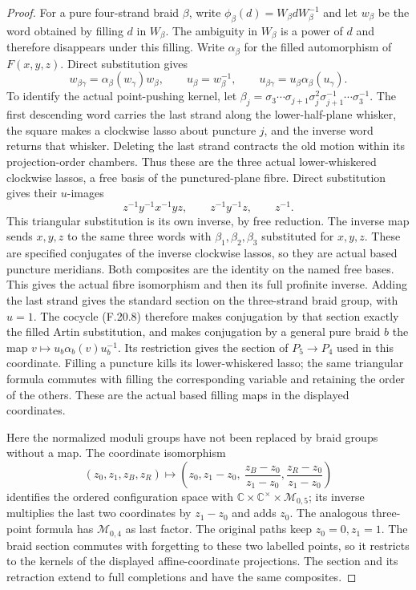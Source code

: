 \begin{proof}
For a pure four-strand braid $\beta$, write
$\phi_\beta(d)=W_\beta dW_\beta^{-1}$ and let $w_\beta$
be the word obtained by filling $d$ in $W_\beta$.
The ambiguity in $W_\beta$ is a power of $d$ and
therefore disappears under this filling.
Write $\alpha_\beta$ for the filled automorphism of
$F(x,y,z)$. Direct substitution gives
\[
 w_{\beta\gamma}=\alpha_\beta(w_\gamma)w_\beta,\qquad
 u_\beta=w_\beta^{-1},\qquad
 u_{\beta\gamma}=u_\beta\alpha_\beta(u_\gamma).
                                                               \tag{F.20.8}
\]
To identify the actual point-pushing kernel, let
$\beta_j=\sigma_3\cdots\sigma_{j+1}\sigma_j^2
 \sigma_{j+1}^{-1}\cdots\sigma_3^{-1}$.
The first descending word carries the last strand along
the lower-half-plane whisker, the square makes a clockwise
lasso about puncture $j$, and the inverse word returns
that whisker. Deleting the last strand contracts the
old motion within its projection-order chambers. Thus
these are the three actual lower-whiskered clockwise
lassos, a free basis of the punctured-plane fibre.
Direct substitution gives their $u$-images
\[
        z^{-1}y^{-1}x^{-1}yz,\qquad
        z^{-1}y^{-1}z,\qquad z^{-1}.
                                                               \tag{F.20.9}
\]
This triangular substitution is its own inverse, by
free reduction. The inverse map sends $x,y,z$ to the
same three words with $\beta_1,\beta_2,\beta_3$
substituted for $x,y,z$. These are specified conjugates
of the inverse clockwise lassos, so they are actual
based puncture meridians. Both composites are the
identity on the named free bases. This gives the actual
fibre isomorphism and then its full profinite inverse.
Adding the last strand gives the standard section on
the three-strand braid group, with $u=1$.
The cocycle (F.20.8) therefore makes conjugation by that
section exactly the filled Artin substitution, and makes
conjugation by a general pure braid $b$ the map
$v\mapsto u_b\alpha_b(v)u_b^{-1}$.
Its restriction gives the section of $P_5\to P_4$
used in this coordinate. Filling a puncture kills its
lower-whiskered lasso; the same triangular formula
commutes with filling the corresponding variable and
retaining the order of the others. These are the actual
based filling maps in the displayed coordinates.

Here the normalized moduli groups have not been replaced
by braid groups without a map. The coordinate isomorphism
\[
 (z_0,z_1,z_B,z_R)\longmapsto
 \left(z_0,z_1-z_0,\
       \frac{z_B-z_0}{z_1-z_0},
       \frac{z_R-z_0}{z_1-z_0}\right)
                                                               \tag{F.20.10}
\]
identifies the ordered configuration space with
$\mathbb C\times\mathbb C^\times\times\mathcal M_{0,5}$;
its inverse multiplies the last two coordinates by
$z_1-z_0$ and adds $z_0$.
The analogous three-point formula has
$\mathcal M_{0,4}$ as last factor.
The original paths keep $z_0=0,z_1=1$.
The braid section commutes with forgetting to these
two labelled points, so it restricts to the kernels
of the displayed affine-coordinate projections.
The section and its retraction extend to full
completions and have the same composites.


\end{proof}
